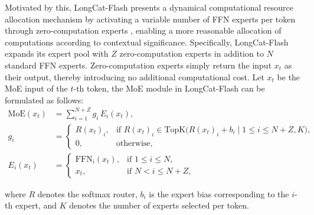 \documentclass{article}
\newcommand{\longcat}{LongCat-Flash\xspace}
\newcommand{\kmax}{K}
\begin{document}
Motivated by this, \longcat presents a dynamical computational resource allocation mechanism by activating a variable number of FFN experts per token through zero-computation experts \citep{jin2024moe++, zeng-etal-2024-adamoe}, enabling a more reasonable allocation of computations according to contextual significance.   
Specifically, \longcat expands its expert pool with $Z$ zero-computation experts  in addition to $N$ standard FFN experts. Zero-computation experts simply return the input $x_t$ as their output, thereby introducing no additional computational cost. Let $x_t$ be the MoE input of the $t$-th token, the MoE module in \longcat can be formulated as follows:
\begin{equation}
\begin{aligned}
    \text{MoE}(x_t) &= \sum_{i=1}^{N+Z} g_i \, E_i(x_t), \\[6pt]
    g_i &= 
    \begin{cases} 
        R(x_t)_i, & \text{if } R(x_t)_i \in \text{TopK}\!\big(R(x_t)_i + b_i \;\big|\; 1 \leq i \leq N+Z, \kmax\big), \\[6pt]
        0, & \text{otherwise}, 
    \end{cases} \\[10pt]
    E_i(x_t) &= 
    \begin{cases} 
        \text{FFN}_i(x_t), & \text{if } 1 \leq i \leq N, \\[6pt]
        x_t, & \text{if } N < i \leq N+Z,
    \end{cases}
\end{aligned}
\end{equation}

\noindent
where $R$ denotes the softmax router, $b_i$ is the expert bias corresponding to the $i$-th expert, and $\kmax$ denotes the number of experts selected per token. 
\end{document}
